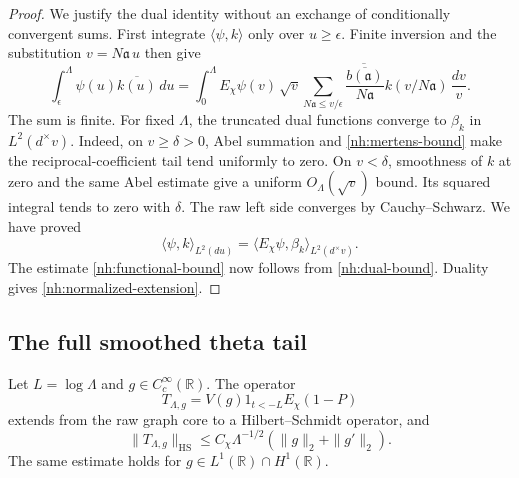 \begin{proof}
We justify the dual identity without an exchange of
conditionally convergent sums. First integrate
$\langle\psi,k\rangle$ only over $u\geq\epsilon$.
Finite inversion and the substitution $v=N\mathfrak a\,u$
then give
\[
 \int_\epsilon^\Lambda\psi(u)\overline{k(u)}\,du
 =\int_0^\Lambda E_\chi\psi(v)\,
       \overline{\sqrt v
          \sum_{N\mathfrak a\leq v/\epsilon}
          \frac{\overline{b(\mathfrak a)}}{N\mathfrak a}
                         k(v/N\mathfrak a)}\,\frac{dv}{v}.
\]
The sum is finite. For fixed $\Lambda$, the truncated dual
functions converge to $\beta_k$ in $L^2(d^\times v)$.
Indeed, on $v\geq\delta>0$, Abel summation and
\eqref{nh:mertens-bound} make the reciprocal-coefficient
tail tend uniformly to zero. On $v<\delta$, smoothness of
$k$ at zero and the same Abel estimate give a uniform
$O_\Lambda(\sqrt v)$ bound. Its squared integral tends to
zero with $\delta$. The raw left side converges by
Cauchy--Schwarz. We have proved
\[
 \langle\psi,k\rangle_{L^2(du)}
       =\langle E_\chi\psi,\beta_k\rangle_{L^2(d^\times v)}.
\]
The estimate \eqref{nh:functional-bound} now follows from
\eqref{nh:dual-bound}. Duality gives
\eqref{nh:normalized-extension}.
\end{proof}

\subsection{The full smoothed theta tail}

\begin{lemma}\label{nh:raw-tail}
Let $L=\log\Lambda$ and $g\in C_c^\infty(\mathbb R)$.
The operator
\[
 T_{\Lambda,g}=V(g)1_{t<-L}E_\chi(1-P)
\]
extends from the raw graph core to a Hilbert--Schmidt operator,
and
\begin{equation}\label{nh:raw-tail-bound}
 \|T_{\Lambda,g}\|_{\mathrm{HS}}
             \leq C_\chi\Lambda^{-1/2}
                             (\|g\|_2+\|g'\|_2).
\end{equation}
The same estimate holds for $g\in L^1(\mathbb R)\cap H^1(\mathbb R)$.
\end{lemma}

